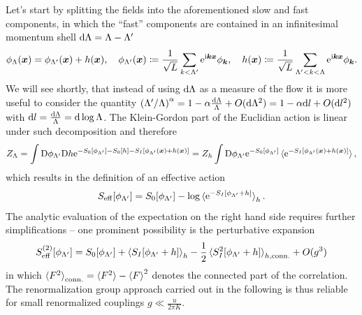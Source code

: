 Let's start by splitting the fields into the aforementioned slow and fast components, in which the ``fast'' components are contained in an infinitesimal momentum shell $\mathrm d\Lambda=\Lambda-\Lambda'$
\begin{align}
    \phi_\Lambda({\bm x}) = \phi_{\Lambda'}({\bm x}) + h({\bm x}),
    \quad
    \phi_{\Lambda'}({\bm x})\coloneqq\frac1{\sqrt L}\sum_{k<\Lambda'}\mathrm e^{\mathrm i {\bm k}{\bm x}}\phi_{\bm k},
    \quad
    h({\bm x}) \coloneqq \frac1{\sqrt L}\sum_{\Lambda'<k<\Lambda}\mathrm e^{\mathrm i {\bm k}{\bm x}}\phi_{\bm k}.
\end{align}
We will see shortly, that instead of using $\mathrm d\Lambda$ as a measure of the flow it is more useful to consider the quantity $\left( \Lambda'/\Lambda \right)^\alpha=1-\alpha\frac{\mathrm d\Lambda}\Lambda + O(\mathrm d\Lambda^2) = 1-\alpha\mathrm d l + O(\mathrm d l^2)$ with $\mathrm d l =\frac{\mathrm d\Lambda}\Lambda = \mathrm d\log\Lambda$.
The Klein-Gordon part of the Euclidian action is linear under such decomposition and therefore
\begin{align}
    Z_\Lambda
    = \int\mathrm D\phi_{\Lambda'}\mathrm D h \mathrm e^{-S_0[\phi_{\Lambda'}]-S_0[h]-S_I[\phi_{\Lambda'}({\bm x}) + h({\bm x})]}
    = Z_h\int\mathrm D\phi_{\Lambda'}\mathrm e^{-S_0[\phi_{\Lambda'}]}\braket{\mathrm e^{-S_I[\phi_{\Lambda'}({\bm x}) + h({\bm x})]}},
\end{align}
which results in the definition of an effective action
\begin{align}
    S_{\rm eff}[\phi_{\Lambda'}] = S_0[\phi_{\Lambda'}] - \log\braket{\mathrm e^{-S_I[\phi_{\Lambda'}+h]}}_h.
\end{align}
The analytic evaluation of the expectation on the right hand side requires further simplifications -- one prominent possibility is the perturbative expansion
\begin{align}
    S^{(2)}_{\rm eff}[\phi_{\Lambda'}] = S_0[\phi_{\Lambda'}] + \braket{S_I[\phi_{\Lambda'}+h]}_h - \frac12\braket{S^2_I[\phi_{\Lambda'}+h]}_{h,{\rm conn.}} + O(g^3)
\end{align}
in which $\braket{F^2}_{\rm conn.} = \braket{F^2}-\braket{F}^2$ denotes the connected part of the correlation.
The renormalization group approach carried out in the following is thus reliable for small renormalized couplings $g\ll \frac u{2\pi K}$.

